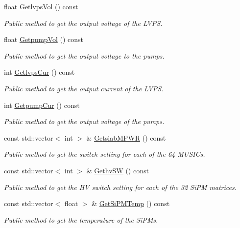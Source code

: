 \begin{DoxyCompactItemize}
float \hyperlink{classIEvent_add6c647d8ed43c3c54fc3f6948600abc}{Getlvps\+Vol} () const
\begin{DoxyCompactList}\small\item\em Public method to get the output voltage of the L\+V\+PS. \end{DoxyCompactList}\item 
float \hyperlink{classIEvent_aa4a82c9fd9a99eee0f84c42d539517bd}{Getpump\+Vol} () const
\begin{DoxyCompactList}\small\item\em Public method to get the output voltage to the pumps. \end{DoxyCompactList}\item 
int \hyperlink{classIEvent_ab00b517486f005b0eef9f38c39ab3bdf}{Getlvps\+Cur} () const
\begin{DoxyCompactList}\small\item\em Public method to get the output current of the L\+V\+PS. \end{DoxyCompactList}\item 
int \hyperlink{classIEvent_a7acdfd044d5d5e099b6a7d1d6f9d7cd1}{Getpump\+Cur} () const
\begin{DoxyCompactList}\small\item\em Public method to get the output voltage of the pumps. \end{DoxyCompactList}\item 
const std\+::vector$<$ int $>$ \& \hyperlink{classIEvent_a3fa8602e84ca81932f2a21a9b5943b1c}{Getsiab\+M\+P\+WR} () const
\begin{DoxyCompactList}\small\item\em Public method to get the switch setting for each of the 64 M\+U\+S\+I\+Cs. \end{DoxyCompactList}\item 
const std\+::vector$<$ int $>$ \& \hyperlink{classIEvent_ab2e215d10ab78c04ef8c40a094dd5293}{Gethv\+SW} () const
\begin{DoxyCompactList}\small\item\em Public method to get the HV switch setting for each of the 32 Si\+PM matrices. \end{DoxyCompactList}\item 
const std\+::vector$<$ float $>$ \& \hyperlink{classIEvent_a575edf25bf25511b33b8555adea334af}{Get\+Si\+P\+M\+Temp} () const
\begin{DoxyCompactList}\small\item\em Public method to get the temperature of the Si\+P\+Ms. \end{DoxyCompactList}\item 

\end{DoxyCompactItemize}
